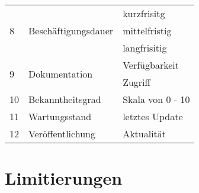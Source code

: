 \begin{table}[h!]
\begin{tabular}{|l|l|l|}
\multirow{3}{*}{8} & \multirow{3}{*}{Beschäftigungsdauer} & kurzfrisitg \\
                   &                                      & mittelfristig \\
                   &                                      & langfrisitig \\ 
\hline

\multirow{2}{*}{9} & \multirow{2}{*}{Dokumentation} & Verfügbarkeit \\
                   &                                & Zugriff \\
\hline

10 & Bekanntheitsgrad & Skala von 0 - 10 \\
\hline

11 & Wartungsstand & letztes Update \\
\hline

12 & Veröffentlichung & Aktualität \\
\hline

\end{tabular}
\end{table}

\section{Limitierungen}
